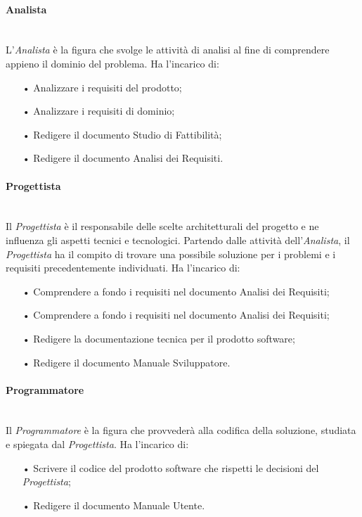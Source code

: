 \paragraph{Analista} \mbox{}\\
L'\textit{Analista} è la figura che svolge le attività di analisi al fine di comprendere appieno il dominio del problema.  
\newline
Ha l'incarico di:
\begin{itemize}
\item[•] Analizzare i requisiti del prodotto;
\item[•] Analizzare i requisiti di dominio;
\item[•] Redigere il documento Studio di Fattibilità;
\item[•] Redigere il documento Analisi dei Requisiti.
\end{itemize}

\paragraph{Progettista} \mbox{}\\
Il \textit{Progettista} è il responsabile delle scelte architetturali del progetto e ne influenza gli aspetti tecnici e tecnologici.  
\newline
Partendo dalle attività dell'\textit{Analista}, il \textit{Progettista} ha il compito di trovare una possibile soluzione per i problemi e i requisiti precedentemente individuati. 
\newline
Ha l'incarico di:
\begin{itemize}
\item[•] Comprendere a fondo i requisiti nel documento Analisi dei Requisiti;
\item[•] Comprendere a fondo i requisiti nel documento Analisi dei Requisiti;
\item[•] Redigere la documentazione tecnica per il prodotto software;
\item[•] Redigere il documento Manuale Sviluppatore.
\end{itemize}

\paragraph{Programmatore} \mbox{}\\
Il \textit{Programmatore} è la figura che provvederà alla codifica della soluzione, studiata e spiegata dal \textit{Progettista}.  
\newline
Ha l'incarico di:
\begin{itemize}
\item[•] Scrivere il codice del prodotto software che rispetti le decisioni del \textit{Progettista};
\item[•] Redigere il documento Manuale Utente.
\end{itemize}

